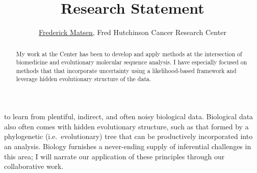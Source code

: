 \documentclass[hyper]{tufte-handout}
\title{Research Statement}
\author{\href{http://matsen.fredhutch.org/}{Frederick Matsen}, Fred Hutchinson Cancer Research Center}
\begin{document}
\maketitle

\begin{abstract}
\noindent
My work at the Center has been to develop and apply methods at the intersection of biomedicine and evolutionary molecular sequence analysis.
I have especially focused on methods that that incorporate uncertainty using a likelihood-based framework and leverage hidden evolutionary structure of the data.
\end{abstract}


 to learn from plentiful, indirect, and often noisy biological data.
Biological data also often comes with hidden evolutionary structure, such as that formed by a phylogenetic (i.e.\ evolutionary) tree that can be productively incorporated into an analysis.
Biology furnishes a never-ending supply of inferential challenges in this area; I will narrate our application of these principles through our collaborative work.
\end{document}
